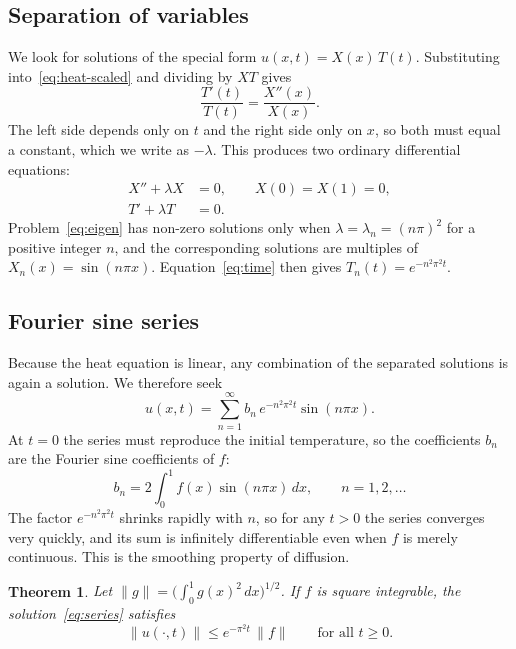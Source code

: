 \documentclass[11pt]{article}
\newtheorem{theorem}{Theorem}[section]
\theoremstyle{definition}
\theoremstyle{remark}
\begin{document}
\subsection{Separation of variables}

We look for solutions of the special form $u(x,t) = X(x)\,T(t)$. Substituting into~\eqref{eq:heat-scaled} and dividing by $X T$ gives
\begin{equation}
  \frac{T'(t)}{T(t)} = \frac{X''(x)}{X(x)} .
\end{equation}
The left side depends only on $t$ and the right side only on $x$, so both must equal a constant, which we write as $-\lambda$. This produces two ordinary differential equations:
\begin{align}
  X'' + \lambda X &= 0, \qquad X(0) = X(1) = 0, \label{eq:eigen} \\
  T' + \lambda T &= 0. \label{eq:time}
\end{align}
Problem~\eqref{eq:eigen} has non-zero solutions only when $\lambda = \lambda_n = (n\pi)^2$ for a positive integer $n$, and the corresponding solutions are multiples of $X_n(x) = \sin(n \pi x)$. Equation~\eqref{eq:time} then gives $T_n(t) = e^{-n^2 \pi^2 t}$.

\subsection{Fourier sine series}

Because the heat equation is linear, any combination of the separated solutions is again a solution. We therefore seek
\begin{equation}\label{eq:series}
  u(x,t) = \sum_{n=1}^{\infty} b_n \, e^{-n^2 \pi^2 t} \sin(n \pi x).
\end{equation}
At $t = 0$ the series must reproduce the initial temperature, so the coefficients $b_n$ are the Fourier sine coefficients of $f$:
\begin{equation}\label{eq:coefficients}
  b_n = 2 \int_0^1 f(x) \sin(n \pi x) \, dx, \qquad n = 1, 2, \ldots
\end{equation}
The factor $e^{-n^2 \pi^2 t}$ shrinks rapidly with $n$, so for any $t > 0$ the series converges very quickly, and its sum is infinitely differentiable even when $f$ is merely continuous. This is the smoothing property of diffusion.

\begin{theorem}\label{thm:decay}
Let $\|g\| = \bigl(\int_0^1 g(x)^2 \, dx\bigr)^{1/2}$. If $f$ is square integrable, the solution~\eqref{eq:series} satisfies
\begin{equation}
  \|u(\cdot, t)\| \le e^{-\pi^2 t} \, \|f\| \qquad \text{for all } t \ge 0 .
\end{equation}
\end{theorem}
\end{document}
